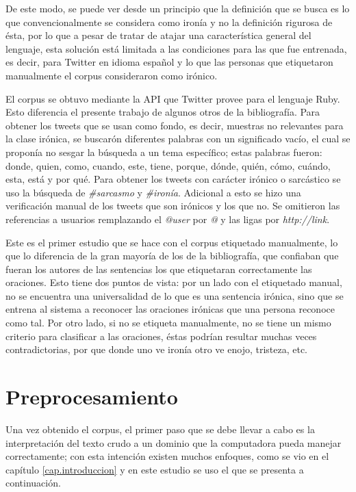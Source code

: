 \par De este modo, se puede ver desde un principio que la definición que se busca es lo que convencionalmente se considera como ironía y no la definición rigurosa de ésta, por lo que a pesar de tratar de atajar una característica general del lenguaje, esta solución está limitada a las condiciones para las que fue entrenada, es decir, para Twitter en idioma español y lo que las personas que etiquetaron manualmente el corpus consideraron como irónico.

\par El corpus se obtuvo mediante la API que Twitter provee para el lenguaje Ruby. Esto diferencia el presente trabajo de algunos otros de la bibliografía. Para obtener los tweets que se usan como fondo, es decir, muestras no relevantes para la clase irónica, se buscarón diferentes palabras con un significado vacío, el cual se proponía no sesgar la búsqueda a un tema específico; estas palabras fueron: donde, quien, como, cuando, este, tiene, porque, dónde, quién, cómo, cuándo, esta, está y por qué. Para obtener los tweets con carácter irónico o sarcástico se uso la búsqueda de \textit{ \#sarcasmo} y \textit{\#ironía}. Adicional a esto se hizo una verificación manual de los tweets que son irónicos y los que no. Se omitieron las referencias a usuarios remplazando el \textit{@user} por \textit{@} y las ligas por \textit{http://link}.

\par Este es el primer estudio que se hace con el corpus etiquetado manualmente, lo que lo diferencia de la gran mayoría de los de la bibliografía, que confiaban que fueran los autores de las sentencias los que etiquetaran correctamente las oraciones. Esto tiene dos puntos de vista: por un lado con el etiquetado manual, no se encuentra una universalidad de lo que es una sentencia irónica, sino que se entrena al sistema a reconocer las oraciones irónicas que una persona reconoce como tal. Por otro lado, si no se etiqueta manualmente, no se tiene un mismo criterio para clasificar a las oraciones, éstas podrían resultar muchas veces contradictorias, por que donde uno ve ironía otro ve enojo, tristeza, etc.

\section{Preprocesamiento}

\par Una vez obtenido el corpus, el primer paso que se debe llevar a cabo es la interpretación del texto crudo a un dominio que la computadora pueda manejar correctamente; con esta intención existen muchos enfoques, como se vio en el capítulo \ref{cap.introduccion} y en este estudio se uso el que se presenta a continuación.
